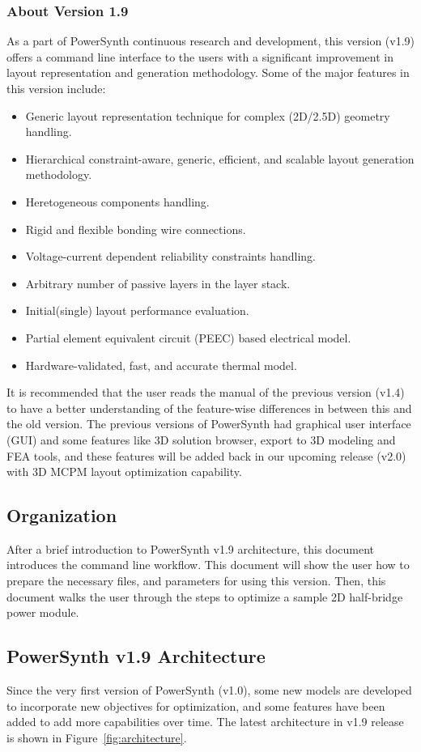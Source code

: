 \documentclass[11pt]{article}
\begin{document}
\subsubsection{About Version 1.9}
As a part of PowerSynth continuous research and development, this version (v1.9) offers a command line interface to the users with a significant improvement in layout representation and generation methodology. 
Some of the major features in this version include:
\begin{itemize}
\item Generic layout representation technique for complex (2D/2.5D) geometry handling.
\item Hierarchical constraint-aware, generic, efficient, and scalable layout generation methodology.
\item Heretogeneous components handling.
\item Rigid and flexible bonding wire connections.
\item Voltage-current dependent reliability constraints handling.
\item Arbitrary number of passive layers in the layer stack.
\item Initial(single) layout performance evaluation.
\item Partial element equivalent circuit (PEEC) based electrical model.
\item Hardware-validated, fast, and accurate thermal model.
\end{itemize} 
It is recommended that the user reads the manual of the previous version (v1.4) to have a better understanding of the feature-wise differences in between this and the old version. The previous versions of PowerSynth had graphical user interface (GUI) and some features like 3D solution browser, export to 3D modeling and FEA tools, and these features will be added back in our upcoming release (v2.0) with 3D MCPM layout optimization capability.
\subsection{Organization}
\label{sec-1-2}
After a brief introduction to PowerSynth v1.9 architecture, this document introduces the command line workflow. This document will show the user how to prepare the necessary files, and parameters for using this version. Then, this document walks the user through the steps to optimize a sample 2D half-bridge power module.

\subsection{PowerSynth v1.9 Architecture}
\label{sec-1-3}
Since the very first version of PowerSynth (v1.0), some new models are developed to incorporate new objectives for optimization, and some features have been added to add more capabilities over time. The latest architecture in v1.9 release is shown in Figure~\ref{fig:architecture}.
\end{document}
